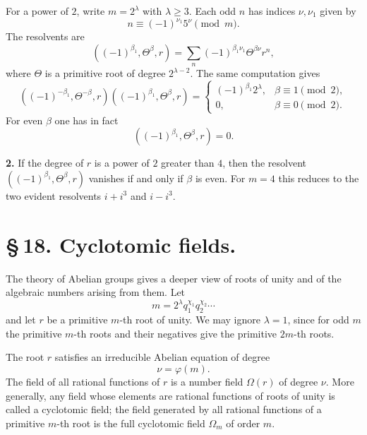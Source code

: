 \documentclass[11pt]{article}
\begin{document}
For a power of $2$, write $m=2^\lambda$ with $\lambda\ge3$. Each odd $n$ has indices $\nu,\nu_1$ given by
\[
 n\equiv (-1)^{\nu_1}5^\nu\pmod m.
\]
The resolvents are
\begin{equation}
 ((-1)^{\beta_1},\Theta^\beta,r)=
 \sum_n (-1)^{\beta_1\nu_1}\Theta^{\beta\nu}r^n,
\tag{14}
\end{equation}
where $\Theta$ is a primitive root of degree $2^{\lambda-2}$. The same computation gives
\begin{equation}
 ((-1)^{-\beta_1},\Theta^{-\beta},r)
 ((-1)^{\beta_1},\Theta^\beta,r)=
 \begin{cases}
 (-1)^{\beta_1}2^\lambda,&\beta\equiv1\pmod2,\\
 0,&\beta\equiv0\pmod2.
 \end{cases}
\tag{17}
\end{equation}
For even $\beta$ one has in fact
\begin{equation}
 ((-1)^{\beta_1},\Theta^\beta,r)=0.
\tag{18}
\end{equation}

\medskip
\noindent\textbf{2.} If the degree of $r$ is a power of $2$ greater than $4$, then the resolvent $((-1)^{\beta_1},\Theta^\beta,r)$ vanishes if and only if $\beta$ is even. For $m=4$ this reduces to the two evident resolvents $i+i^3$ and $i-i^3$.

\section*{\S\,18. Cyclotomic fields.}

The theory of Abelian groups gives a deeper view of roots of unity and of the algebraic numbers arising from them. Let
\begin{equation}
 m=2^\lambda q_1^{\chi_1}q_2^{\chi_2}\cdots
\tag{1}
\end{equation}
and let $r$ be a primitive $m$-th root of unity. We may ignore $\lambda=1$, since for odd $m$ the primitive $m$-th roots and their negatives give the primitive $2m$-th roots.

The root $r$ satisfies an irreducible Abelian equation of degree
\begin{equation}
 \nu=\varphi(m).
\tag{2}
\end{equation}
The field of all rational functions of $r$ is a number field $\Omega(r)$ of degree $\nu$. More generally, any field whose elements are rational functions of roots of unity is called a cyclotomic field; the field generated by all rational functions of a primitive $m$-th root is the full cyclotomic field $\Omega_m$ of order $m$.
\end{document}
